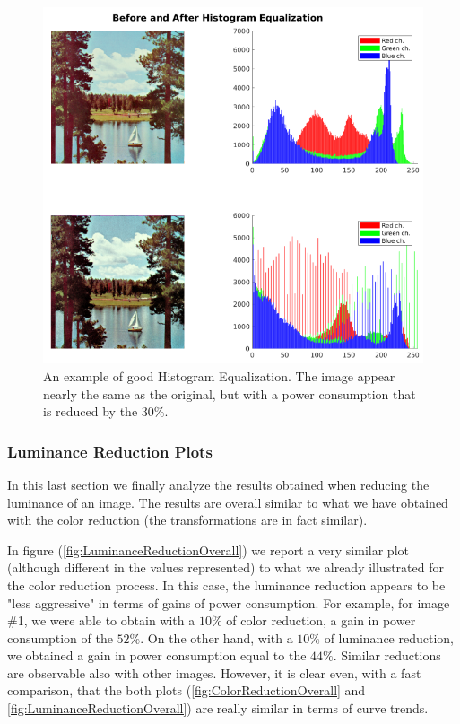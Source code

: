 \documentclass[a4paper]{article}
\begin{document}
            \begin{figure}[htp]
                \centering
                \includegraphics[width=0.6 \columnwidth]{./screenshots/hist_equalization_RGB_img_13}
                \caption{
                        \label{fig:hist_equalization_RGB_img_13}
                        An example of good Histogram Equalization. The image appear nearly the same as the original, but with a power consumption that is reduced by the $30\%$.
                }
            \end{figure}

        \subsubsection{Luminance Reduction Plots}
            In this last section we finally analyze the results obtained when reducing the luminance of an image. The results are overall similar to what we have obtained with the color reduction (the transformations are in fact similar).
            
            In figure (\ref{fig:LuminanceReductionOverall}) we report a very similar plot (although different in the values represented) to what we already illustrated for the color reduction process.
            In this case, the luminance reduction appears to be "less aggressive" in terms of gains of power consumption.
            For example, for image \#1, we were able to obtain with a $10\%$ of color reduction, a gain in power consumption of the $52\%$. On the other hand, with a $10\%$ of luminance reduction, we obtained a gain in power consumption equal to the $44\%$. Similar reductions are observable also with other images. However, it is clear even, with a fast comparison, that the both plots (\ref{fig:ColorReductionOverall} and \ref{fig:LuminanceReductionOverall}) are really similar in terms of curve trends.
\end{document}
